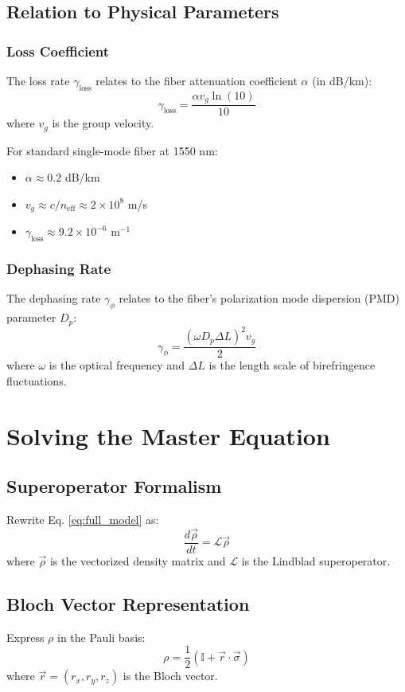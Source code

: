 \documentclass[12pt]{article}
\begin{document}
\subsection{Relation to Physical Parameters}

\subsubsection{Loss Coefficient}
The loss rate $\gamma_{\text{loss}}$ relates to the fiber attenuation coefficient $\alpha$ (in dB/km):
\[
\gamma_{\text{loss}} = \frac{\alpha v_g \ln(10)}{10}
\]
where $v_g$ is the group velocity.

For standard single-mode fiber at 1550 nm:
\begin{itemize}
    \item $\alpha \approx 0.2$ dB/km
    \item $v_g \approx c/n_{\text{eff}} \approx 2 \times 10^8$ m/s
    \item $\gamma_{\text{loss}} \approx 9.2 \times 10^{-6}$ m$^{-1}$
\end{itemize}

\subsubsection{Dephasing Rate}
The dephasing rate $\gamma_{\phi}$ relates to the fiber's polarization mode dispersion (PMD) parameter $D_p$:
\[
\gamma_{\phi} = \frac{(\omega D_p \Delta L)^2 v_g}{2}
\]
where $\omega$ is the optical frequency and $\Delta L$ is the length scale of birefringence fluctuations.

\section{Solving the Master Equation}

\subsection{Superoperator Formalism}
Rewrite Eq. \eqref{eq:full_model} as:
\[
\frac{d\vec{\rho}}{dt} = \mathcal{L} \vec{\rho}
\]
where $\vec{\rho}$ is the vectorized density matrix and $\mathcal{L}$ is the Lindblad superoperator.

\subsection{Bloch Vector Representation}
Express $\rho$ in the Pauli basis:
\[
\rho = \frac{1}{2} \left( \mathbb{I} + \vec{r} \cdot \vec{\sigma} \right)
\]
where $\vec{r} = (r_x, r_y, r_z)$ is the Bloch vector.
\end{document}
